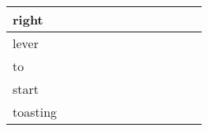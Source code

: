 \documentclass[landscape]{article}
\newcommand{\ssp}{\hspace{2pt}}
\begin{document}
\begin{tabular}{|l|p{10pt}|p{10pt}|p{10pt}|p{10pt}|p{10pt}|p{10pt}|p{10pt}|p{10pt}|p{10pt}|p{10pt}|p{10pt}|}
\hline
\ssp right \ssp&\hspace{2pt}&\hspace{2pt}&\hspace{2pt}&\hspace{2pt}&\hspace{2pt}&\hspace{2pt}&\hspace{2pt}&\hspace{2pt}&\hspace{2pt}&\hspace{2pt}&\hspace{2pt}\\
\hline
\ssp lever \ssp&\hspace{2pt}&\hspace{2pt}&\hspace{2pt}&\hspace{2pt}&\hspace{2pt}&\hspace{2pt}&\hspace{2pt}&\hspace{2pt}&\hspace{2pt}&\hspace{2pt}&\hspace{2pt}\\
\hline
\ssp to \ssp&\hspace{2pt}&\hspace{2pt}&\hspace{2pt}&\hspace{2pt}&\hspace{2pt}&\hspace{2pt}&\hspace{2pt}&\hspace{2pt}&\hspace{2pt}&\hspace{2pt}&\hspace{2pt}\\
\hline
\ssp start \ssp&\hspace{2pt}&\hspace{2pt}&\hspace{2pt}&\hspace{2pt}&\hspace{2pt}&\hspace{2pt}&\hspace{2pt}&\hspace{2pt}&\hspace{2pt}&\hspace{2pt}&\hspace{2pt}\\
\hline
\ssp toasting \ssp&\hspace{2pt}&\hspace{2pt}&\hspace{2pt}&\hspace{2pt}&\hspace{2pt}&\hspace{2pt}&\hspace{2pt}&\hspace{2pt}&\hspace{2pt}&\hspace{2pt}&\hspace{2pt}\\

\end{tabular}
\end{document}
